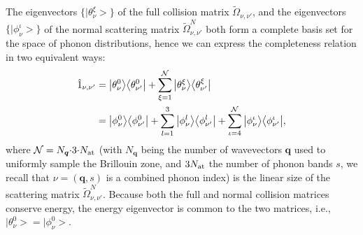 \documentclass[
prb,
twocolumn,
superscriptaddress,
 amsmath,amssymb,
 aps,
longbibliography,
]{revtex4-2}
\begin{document}
The eigenvectors $\{\big|
\theta^{\xi}_{\nu} \big>\}$ of the full collision matrix $\widetilde{\Omega}_{\nu,\nu'}$, and the eigenvectors $\{\big|\phi^{\iota}_{\nu} \big>\}$ of the normal scattering matrix $\widetilde{\Omega}^N_{\nu,\nu'}$ both form a complete basis set for the space of phonon distributions, hence we can express the completeness relation in two equivalent ways:
\begin{equation}
\begin{split}
\hat{1}_{\nu,\nu'} &=
\big|\theta^{0}_{\nu} \big> \big<\theta^{0}_{\nu'}  \big|+
\sum_{\xi=1}^{\mathcal{N}}\big|
\theta^{\xi}_{\nu} \big> \big<\theta^{\xi}_{\nu'} \big|\\
&=\big|\phi^{0}_{\nu} \big> \big<\phi^{0}_{\nu'}  \big|+
\sum_{l=1}^3\big|\phi^{l}_{\nu} \big> \big<\phi^{l}_{\nu'}  \big|+
\sum_{\iota=4}^{\mathcal{N}}\big|\phi^{\iota}_{\nu} \big> \big<\phi^{\iota}_{\nu'} \big|,
\end{split}
\label{eq:expansion_identity}
\raisetag{20mm}
\end{equation}
where $\mathcal{N}=N_{\bm{q}}{\cdot} 3 {\cdot} N_{\rm at}$ (with $N_{\bm{q}}$ being the number of wavevectors $\bm{q}$ used to uniformly sample the Brillouin zone, and $3 N_{\rm at}$ the number of phonon bands $s$, we recall that $\nu=(\bm{q},s)$ is a combined phonon index) is the linear size of the scattering matrix $\widetilde{\Omega}^N_{\nu,\nu'}$.
Because both the full and normal collision matrices conserve energy, the energy eigenvector is common to the two matrices, i.e., $\big|\theta^{0}_{\nu} \big>=\big|\phi^{0}_{\nu} \big>$.
\end{document}
